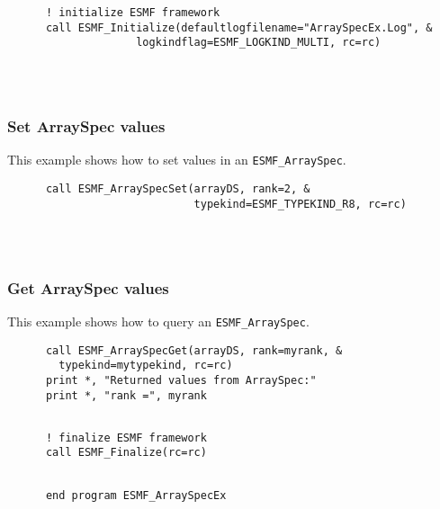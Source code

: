 
 \begin{verbatim}
      ! initialize ESMF framework
      call ESMF_Initialize(defaultlogfilename="ArraySpecEx.Log", &
                    logkindflag=ESMF_LOGKIND_MULTI, rc=rc)
 
\end{verbatim}
 
 
\mbox{}\hrulefill\ 
 

  \subsubsection{Set ArraySpec values}
 
   This example shows how to set values in an {\tt ESMF\_ArraySpec}. 

 \begin{verbatim}
      call ESMF_ArraySpecSet(arrayDS, rank=2, &
                             typekind=ESMF_TYPEKIND_R8, rc=rc)
 
\end{verbatim}
 
 
\mbox{}\hrulefill\ 
 

  \subsubsection{Get ArraySpec values}
 
   This example shows how to query an {\tt ESMF\_ArraySpec}. 

 \begin{verbatim}
      call ESMF_ArraySpecGet(arrayDS, rank=myrank, &
        typekind=mytypekind, rc=rc)
      print *, "Returned values from ArraySpec:"
      print *, "rank =", myrank
 
\end{verbatim}
 

 \begin{verbatim}
      ! finalize ESMF framework
      call ESMF_Finalize(rc=rc)
 
\end{verbatim}
 

 \begin{verbatim}
      end program ESMF_ArraySpecEx
 
\end{verbatim}

\setlength{\parskip}{\oldparskip}
\setlength{\parindent}{\oldparindent}
\setlength{\baselineskip}{\oldbaselineskip}

